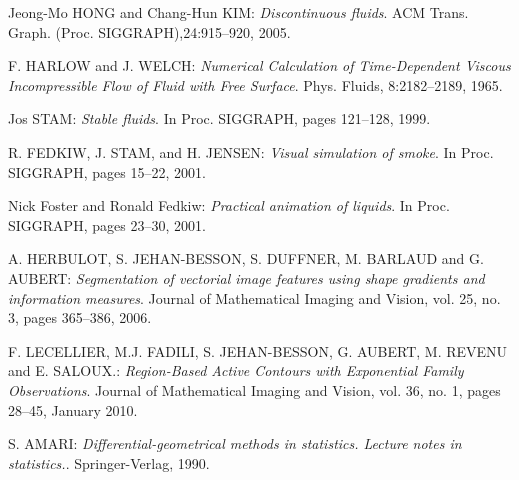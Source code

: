 \documentclass[11pt]{report}
\begin{document}
\newpage

\begin{thebibliography}{2}
Jeong-Mo HONG and Chang-Hun KIM:
\textit{Discontinuous fluids}.
ACM Trans. Graph. (Proc. SIGGRAPH),24:915–920, 2005.

F. HARLOW and J. WELCH:
\textit{Numerical Calculation of Time-Dependent Viscous Incompressible Flow of
Fluid with Free Surface}.
Phys. Fluids, 8:2182–2189, 1965.

Jos STAM:
\textit{Stable fluids}.
In Proc. SIGGRAPH, pages 121–128, 1999.

R. FEDKIW, J. STAM, and H. JENSEN:
\textit{Visual simulation of smoke}.
In Proc. SIGGRAPH, pages 15–22, 2001.

Nick Foster and Ronald Fedkiw:
\textit{Practical animation of liquids}.
In Proc. SIGGRAPH, pages 23–30, 2001.

A. HERBULOT, S. JEHAN-BESSON, S. DUFFNER, M. BARLAUD and G. AUBERT:
\textit{Segmentation of vectorial image features using shape gradients and information measures}.
Journal of Mathematical Imaging and Vision, vol. 25, no. 3, pages 365–386, 2006.

F. LECELLIER, M.J. FADILI, S. JEHAN-BESSON, G. AUBERT, M. REVENU and E. SALOUX.:
\textit{Region-Based Active Contours with Exponential Family Observations}.
Journal of Mathematical Imaging and Vision, vol. 36, no. 1, pages 28–45, January 2010.

S. AMARI:
\textit{Differential-geometrical methods in statistics. Lecture notes in statistics.}.
Springer-Verlag, 1990.



\end{thebibliography}
\end{document}
